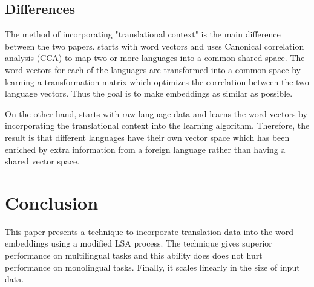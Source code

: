 \documentclass[11pt]{article}
\begin{document}
\subsection{Differences}
The method of incorporating "translational context" is the main difference between the two papers. \cite{faruqui2014improving} starts with word vectors and uses Canonical correlation analysis (CCA) to map two or more languages into a common shared space. The word vectors for each of the languages are transformed into a common space by learning a transformation matrix which optimizes the correlation between the two language vectors. Thus the goal is to make embeddings as similar as possible.

On the other hand, \cite{huang2015translation} starts with raw language data and learns the word vectors by incorporating the translational context into the learning algorithm. Therefore, the result is that different languages have their own vector space which has been enriched by extra information from a foreign language rather than having a shared vector space.


\section{Conclusion}
This paper presents a technique to incorporate translation data into the word embeddings using a modified LSA process. The technique gives superior performance on multilingual tasks and this ability does does not hurt performance on monolingual tasks. Finally, it scales linearly in the size of input data.




\end{document}
